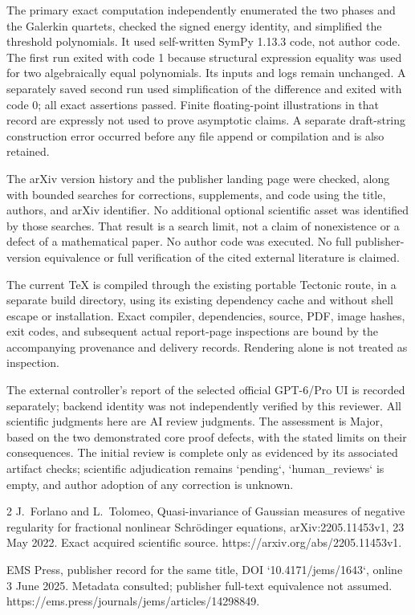\documentclass[10pt]{article}
\begin{document}
The primary exact computation independently enumerated the two phases and the Galerkin quartets, checked the signed energy identity, and simplified the threshold polynomials. It used self-written SymPy 1.13.3 code, not author code. The first run exited with code 1 because structural expression equality was used for two algebraically equal polynomials. Its inputs and logs remain unchanged. A separately saved second run used simplification of the difference and exited with code 0; all exact assertions passed. Finite floating-point illustrations in that record are expressly not used to prove asymptotic claims. A separate draft-string construction error occurred before any file append or compilation and is also retained.\par
The arXiv version history and the publisher landing page were checked, along with bounded searches for corrections, supplements, and code using the title, authors, and arXiv identifier. No additional optional scientific asset was identified by those searches. That result is a search limit, not a claim of nonexistence or a defect of a mathematical paper. No author code was executed. No full publisher-version equivalence or full verification of the cited external literature is claimed.\par
The current TeX is compiled through the existing portable Tectonic route, in a separate build directory, using its existing dependency cache and without shell escape or installation. Exact compiler, dependencies, source, PDF, image hashes, exit codes, and subsequent actual report-page inspections are bound by the accompanying provenance and delivery records. Rendering alone is not treated as inspection.\par
The external controller’s report of the selected official GPT-6/Pro UI is recorded separately; backend identity was not independently verified by this reviewer. All scientific judgments here are AI review judgments. The assessment is Major, based on the two demonstrated core proof defects, with the stated limits on their consequences. The initial review is complete only as evidenced by its associated artifact checks; scientific adjudication remains `pending`, `human\_reviews` is empty, and author adoption of any correction is unknown.\par
2 J. Forlano and L. Tolomeo, Quasi-invariance of Gaussian measures of negative regularity for fractional nonlinear Schrödinger equations, arXiv:2205.11453v1, 23 May 2022. Exact acquired scientific source. https://arxiv.org/abs/2205.11453v1.\par
EMS Press, publisher record for the same title, DOI `10.4171/jems/1643`, online 3 June 2025. Metadata consulted; publisher full-text equivalence not assumed. https://ems.press/journals/jems/articles/14298849.\par
\end{document}

